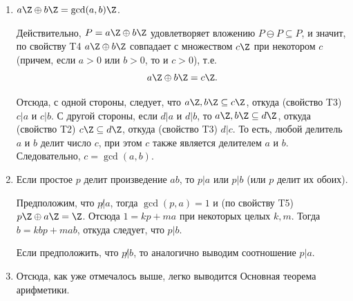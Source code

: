 {\begin{enumerate}[T1]
Далее, если $P\setminus a\Z$ не пусто, то существует $x\in P\setminus a\Z$, причем $x=ka+d$, где $0<d<a$ (то есть $x$ не кратен $a$). Тогда $d=x-ka\in P\ominus P$, т.е. $d\in P$, что противоречит выбору $a$ как минимального положительного элемента $P$. Следовательно, $P\subseteq a\Z$, что вместе с предыдущим вложением дает $P=a\Z$.

Таким образом, если $P\ominus P\subseteq P$, то либо $P=\emptyset$, либо $P=a\Z$ при некотором целом $a$ (в том числе. при $a=0$ имеем $P=\{0\}$).

\item $a\Z\oplus b\Z=\gcd(a,b)\Z$.

Действительно, $P=a\Z\oplus b\Z$ удовлетворяет вложению $P\ominus P\subseteq P$, и значит, по свойству T4 $a\Z\oplus b\Z$ совпадает с множеством $c\Z$ при некотором $c$ (причем, если $a>0$ или $b>0$, то и $c>0$), т.е.
$$
a\Z\oplus b\Z=c\Z.
$$

Отсюда, с одной стороны, следует, что $a\Z,b\Z\subseteq c\Z$, откуда (свойство T3) $c|a$ и $c|b$. С другой стороны, если $d|a$ и $d|b$, то $a\Z,b\Z\subseteq d\Z$, откуда (свойство T2) $c\Z\subseteq d\Z$, откуда (свойство T3) $d|c$. То есть, любой делитель $a$ и $b$ делит число $c$, при этом $c$ также является делителем $a$ и $b$. Следовательно, $c=\gcd(a,b)$.

\item Если простое $p$ делит произведение $ab$, то $p|a$ или $p|b$ (или $p$ делит их обоих).

Предположим, что $p\not|a$, тогда $\gcd(p,a)=1$ и (по свойству T5) $p\Z\oplus a\Z=\Z$. Отсюда $1=kp+ma$ при некоторых целых $k,m$. Тогда $b=kbp+mab$, откуда следует, что $p|b$.

Если предположить, что $p\not|b$, то аналогично выводим соотношение $p|a$.
\item Отсюда, как уже отмечалось выше, легко выводится Основная теорема арифметики.
\end{enumerate}

}


